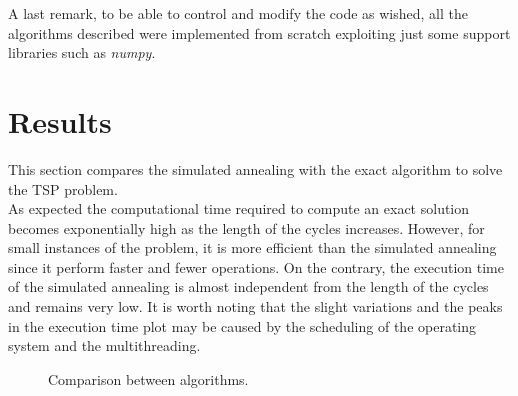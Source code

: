 \documentclass{article}
\begin{document}
\noindent A last remark, to be able to control and modify the code as wished, all the algorithms described were implemented from scratch exploiting just some support libraries such as \textit{numpy}.

\section{Results}
This section compares the simulated annealing with the exact algorithm to solve the TSP problem. \\
As expected the computational time required to compute an exact solution becomes exponentially high as the length of the cycles increases. However, for small instances of the problem, it is more efficient than the simulated annealing since it perform faster and fewer operations. On the contrary, the execution time of the simulated annealing is almost independent from the length of the cycles and remains very low. It is worth noting that the slight variations and the peaks in the execution time plot may be caused by the scheduling of the operating system and the multithreading.
\begin{figure}[H]
\begin{adjustwidth}{-4em}{-4em}

     \hfill
     
     \caption{Comparison between algorithms.}
    \end{adjustwidth}
   \end{figure}
 
\end{document}
